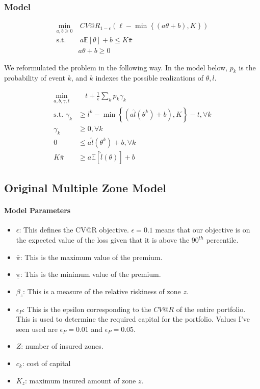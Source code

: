 \documentclass[11pt]{article}
\begin{document}
\subsubsection*{Model}
\begin{align}
    \min_{a,b\geq 0} &\ CV@R_{1-\epsilon}\left(\ell  - \min\left\{(a\theta + b), K\right\} \right)\\
    \text{s.t.   } &\   a \mathbb{E} \left[\theta \right] + b\label{eq-02} \leq K\bar{\pi}\\
     & a\theta + b \geq 0 
\end{align}

We reformulated the problem in the following way. In the model below, $p_k$ is the probability of event $k$, and $k$ indexes the possible realizations of $\theta, l$.

\begin{align}
    \min_{a,b,\gamma,t} &\quad t + \frac{1}{\epsilon}\sum_k p_k \gamma_k\\
    \text{s.t.   } \gamma_k &\geq l^k - \min\left\{(a\hat{l}(\theta^k) + b), K\right\} - t, \forall k\\
    \gamma_k &\geq 0, \forall k \\
    0 &\leq a\hat{l}(\theta^k) + b, \forall k\\
    K\bar{\pi} &\geq a\mathbb{E}[\hat{l}(\theta)] + b
\end{align}

\subsection*{Original Multiple Zone Model}
\paragraph*{Model Parameters}
    \begin{itemize}
        \item $\epsilon$: This defines the CV@R objective. $\epsilon = 0.1$ means that our objective is on the expected value of the loss given that it is above the $90^{th}$ percentile. 
        \item $\bar{\pi}$: This is the maximum value of the premium. 
        \item $\underline{\pi}$: This is the minimum value of the premium. 
        \item $\beta_z$: This is a measure of the relative riskiness of zone $z$. 
        \item $\epsilon_P$: This is the epsilon corresponding to the $CV@R$ of the entire portfolio. This is used to determine the required capital for the portfolio. Values I've seen used are $\epsilon_P=0.01$ and $\epsilon_P=0.05$. 
        \item $Z$: number of insured zones.
        \item $c_k$: cost of capital
        \item $K_z$: maximum insured amount of zone $z$.  
    \end{itemize}
\end{document}
